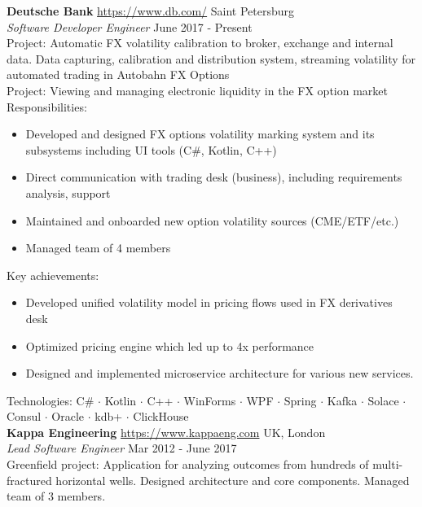\documentclass[a4paper]{article}
\begin{document}
\textbf{Deutsche Bank} \quad \url{https://www.db.com/} \hfill Saint Petersburg\\
\textit{Software Developer Engineer} \hfill June 2017 - Present\\
\vspace{1mm}
Project: Automatic FX volatility calibration to broker, exchange and internal data. Data capturing, calibration and distribution system, streaming volatility for automated trading in Autobahn FX Options \\
\vspace{1mm}
Project: Viewing and managing electronic liquidity in the FX option market \\
\vspace{1mm}
Responsibilities:
\begin{itemize} \itemsep 1pt
	\item Developed and designed FX options volatility marking system and it\textquotesingle{}s subsystems including UI tools (C\#, Kotlin, C++)
    \item Direct communication with trading desk (business), including requirements analysis, support
    \item Maintained and onboarded new option volatility sources (CME/ETF/etc.)
    \item Managed team of 4 members
\end{itemize}
Key achievements:
\begin{itemize} \itemsep 1pt
	\item Developed unified volatility model in pricing flows used in FX derivatives desk
    \item Optimized pricing engine which led up to 4x performance
    \item Designed and implemented microservice architecture for various new services.
\end{itemize}
Technologies: C\# $\cdot$ Kotlin $\cdot$ C++ $\cdot$ WinForms $\cdot$ WPF $\cdot$ Spring $\cdot$ Kafka $\cdot$ Solace $\cdot$ Consul $\cdot$ Oracle $\cdot$ kdb+ $\cdot$ ClickHouse \\
\vspace{3mm}
\textbf{Kappa Engineering} \quad \url{https://www.kappaeng.com} \hfill UK, London\\
\textit{Lead Software Engineer} \hfill Mar 2012 - June 2017\\
\vspace{1mm}
Greenfield project: Application for analyzing outcomes from hundreds of multi-fractured horizontal wells. Designed architecture and core components. Managed team of 3 members. \\
\end{document}
